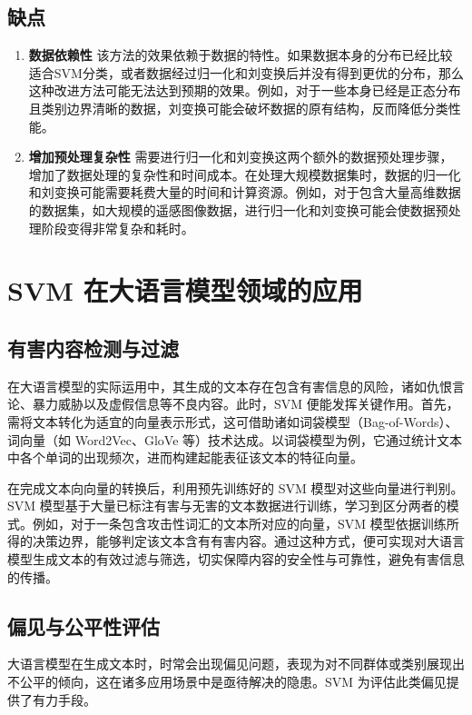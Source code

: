 \documentclass[12pt]{article}
\begin{document}
\subsection{缺点}
\begin{enumerate}
    \item \textbf{数据依赖性}
    该方法的效果依赖于数据的特性。如果数据本身的分布已经比较适合SVM分类，或者数据经过归一化和刘变换后并没有得到更优的分布，那么这种改进方法可能无法达到预期的效果。例如，对于一些本身已经是正态分布且类别边界清晰的数据，刘变换可能会破坏数据的原有结构，反而降低分类性能。
    \item \textbf{增加预处理复杂性}
    需要进行归一化和刘变换这两个额外的数据预处理步骤，增加了数据处理的复杂性和时间成本。在处理大规模数据集时，数据的归一化和刘变换可能需要耗费大量的时间和计算资源。例如，对于包含大量高维数据的数据集，如大规模的遥感图像数据，进行归一化和刘变换可能会使数据预处理阶段变得非常复杂和耗时。
\end{enumerate}

\section{SVM 在大语言模型领域的应用}

\subsection{有害内容检测与过滤}
在大语言模型的实际运用中，其生成的文本存在包含有害信息的风险，诸如仇恨言论、暴力威胁以及虚假信息等不良内容。此时，SVM 便能发挥关键作用。首先，需将文本转化为适宜的向量表示形式，这可借助诸如词袋模型（Bag-of-Words）、词向量（如 Word2Vec、GloVe 等）技术达成。以词袋模型为例，它通过统计文本中各个单词的出现频次，进而构建起能表征该文本的特征向量。

在完成文本向向量的转换后，利用预先训练好的 SVM 模型对这些向量进行判别。SVM 模型基于大量已标注有害与无害的文本数据进行训练，学习到区分两者的模式。例如，对于一条包含攻击性词汇的文本所对应的向量，SVM 模型依据训练所得的决策边界，能够判定该文本含有有害内容。通过这种方式，便可实现对大语言模型生成文本的有效过滤与筛选，切实保障内容的安全性与可靠性，避免有害信息的传播。

\subsection{偏见与公平性评估}
大语言模型在生成文本时，时常会出现偏见问题，表现为对不同群体或类别展现出不公平的倾向，这在诸多应用场景中是亟待解决的隐患。SVM 为评估此类偏见提供了有力手段。
\end{document}
